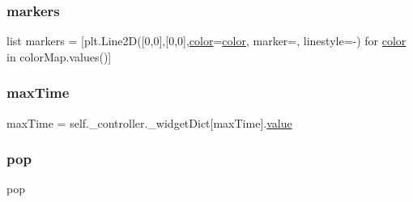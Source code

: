 \mbox{\label{class_mu_mo_t_1_1_mu_mo_tview_a6a57a88c0fcb681f5721c6b1bce2dd96}} 
\subsubsection{\texorpdfstring{markers}{markers}}
{\footnotesize\ttfamily list markers = \mbox{[}plt.\+Line2D(\mbox{[}0,0\mbox{]},\mbox{[}0,0\mbox{]},\hyperlink{class_mu_mo_t_1_1_mu_mo_tview_a37dbdc30935031c05304482e1be89d8f}{color}=\hyperlink{class_mu_mo_t_1_1_mu_mo_tview_a37dbdc30935031c05304482e1be89d8f}{color}, marker=\textquotesingle{}\textquotesingle{}, linestyle=\textquotesingle{}-\/\textquotesingle{}) for \hyperlink{class_mu_mo_t_1_1_mu_mo_tview_a37dbdc30935031c05304482e1be89d8f}{color} in color\+Map.\+values()\mbox{]}\hspace{0.3cm}{\ttfamily [static]}}

\mbox{\label{class_mu_mo_t_1_1_mu_mo_tview_aa820f7e11b025b06f4eeb0ad7581ad34}} 
\subsubsection{\texorpdfstring{max\+Time}{maxTime}}
{\footnotesize\ttfamily max\+Time = self.\+\_\+controller.\+\_\+widget\+Dict\mbox{[}\textquotesingle{}max\+Time\textquotesingle{}\mbox{]}.\hyperlink{class_mu_mo_t_1_1_mu_mo_tview_afcc7a4b78ecd8fa7e713f8cfa0f51017}{value}\hspace{0.3cm}{\ttfamily [static]}}

\mbox{\label{class_mu_mo_t_1_1_mu_mo_tview_a23acc33d21869c517c7eb8114b3d8072}} 
\subsubsection{\texorpdfstring{pop}{pop}}
{\footnotesize\ttfamily pop\hspace{0.3cm}{\ttfamily [static]}}

